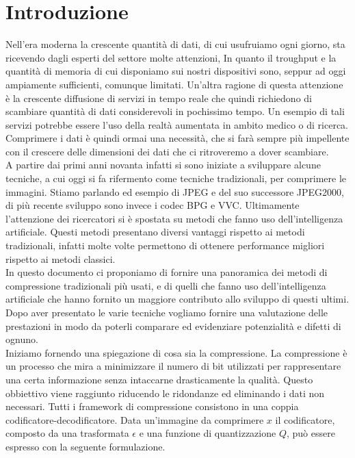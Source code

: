 \chapter*{Introduzione}
Nell’era moderna la crescente quantità di dati, di cui usufruiamo ogni giorno, sta ricevendo dagli esperti del settore molte attenzioni, In quanto il troughput e la quantità di memoria di cui disponiamo sui nostri dispositivi sono, seppur ad oggi ampiamente sufficienti, comunque limitati. Un’altra ragione di questa attenzione è la crescente diffusione di servizi in tempo reale che quindi richiedono di scambiare quantità di dati considerevoli in pochissimo tempo. Un esempio di tali servizi potrebbe essere l’uso della realtà aumentata in ambito medico o di ricerca. Comprimere i dati è quindi ormai una necessità, che si farà sempre più impellente con il crescere delle dimensioni dei dati che ci ritroveremo a dover scambiare.\\
A partire dai primi anni novanta infatti si sono iniziate a sviluppare alcune tecniche, a cui oggi si fa rifermento come tecniche tradizionali, per comprimere le immagini. Stiamo parlando ed esempio di JPEG e del suo successore JPEG2000, di più recente sviluppo sono invece i codec BPG e VVC.
Ultimamente l’attenzione dei ricercatori si è spostata su metodi che fanno uso dell'intelligenza artificiale. Questi metodi presentano diversi vantaggi rispetto ai metodi tradizionali, infatti molte volte permettono di ottenere performance migliori rispetto ai metodi classici.\\
In questo documento ci proponiamo di fornire una panoramica dei metodi di compressione tradizionali più usati, e di quelli che fanno uso dell'intelligenza artificiale che hanno fornito un maggiore contributo allo sviluppo di questi ultimi. Dopo aver presentato le varie tecniche vogliamo fornire una valutazione delle prestazioni in modo da poterli comparare ed evidenziare potenzialità e difetti di ognuno.\\
Iniziamo fornendo una spiegazione di cosa sia la compressione. La compressione è un processo che mira a minimizzare il numero di bit utilizzati per rappresentare una certa informazione senza intaccarne drasticamente la qualità. Questo obbiettivo viene raggiunto riducendo le ridondanze ed eliminando i dati non necessari.
Tutti i framework di compressione consistono in una coppia codificatore-decodificatore. Data un’immagine da comprimere $x$ il codificatore, composto da una trasformata $\epsilon$ e una funzione di quantizzazione $Q$, può essere espresso con la seguente formulazione.\\
